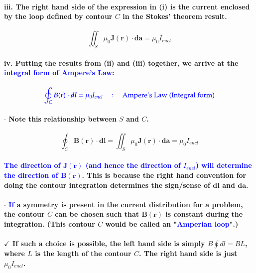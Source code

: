 \documentclass{article}
\begin{document}
\paragraph{\indent\indent iii. The right hand side of the expression in (i) is the current enclosed by the loop defined by contour $C$ in the Stokes' theorem result.}
\begin{equation*}
    \iint_S \mu_0\boldsymbol{J}(\boldsymbol{r})\cdot\boldsymbol{da}=\mu_0 I_{encl}
\end{equation*}
\paragraph{\indent\indent iv. Putting the results from (ii) and (iii) together, we arrive at the \textcolor{blue}{integral form of Ampere's Law}:}
\begin{equation*}
    \textcolor{blue}{\oint_C \boldsymbol{B}(\boldsymbol{r})\cdot\boldsymbol{dl}=\mu_0 I_{encl}\quad:\quad \text{Ampere's Law (Integral form)}}
\end{equation*}
\paragraph{\indent\indent $\cdot$ Note this relationship between $S$ and $C$.}
\begin{equation*}
    \oint_C\boldsymbol{B}(\boldsymbol{r})\cdot\boldsymbol{dl}=\iint_S\mu_0\boldsymbol{J}(\boldsymbol{r})\cdot\boldsymbol{da}=\mu_0 I_{encl}
\end{equation*}
\paragraph{\indent\indent \textcolor{blue}{The direction of $\boldsymbol{J}(\boldsymbol{r})$ (and hence the direction of $I_{encl}$) will determine the direction of $\boldsymbol{B}(\boldsymbol{r})$}. This is because the right hand convention for doing the contour integration determines the sign/sense of $\boldsymbol{dl}$ and $\boldsymbol{da}$.}
\paragraph{\indent\indent $\cdot$ \textcolor{blue}{If} a symmetry is present in the current distribution for a problem, the contour $C$ can be chosen such that $\boldsymbol{B}(\boldsymbol{r})$ is constant during the integration. (This contour $C$ would be called an "\textcolor{blue}{Amperian loop}".)}
\paragraph{\indent\indent $\checkmark$ If such a choice is possible, the left hand side is simply $B\oint dl=BL$, where $L$ is the length of the contour $C$. The right hand side is just $\mu_0I_{encl}$.}
\end{document}
